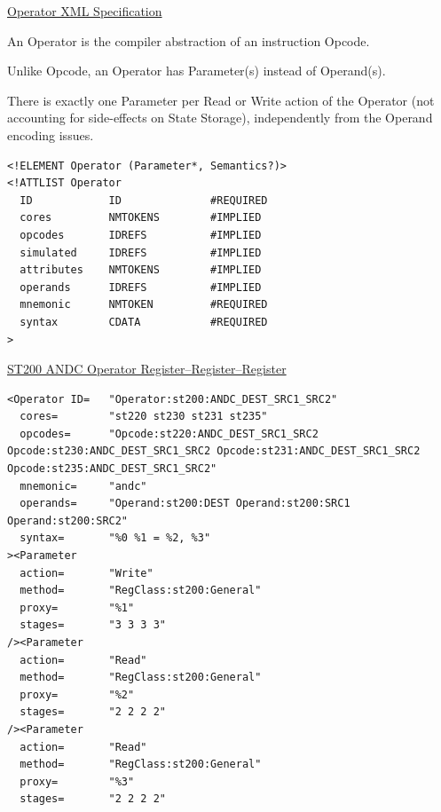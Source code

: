 \documentclass[a4]{seminar}
\begin{document}
\begin{slide}

\begin{center} \underline{Operator XML Specification} \end{center}

An Operator is the compiler abstraction of an instruction Opcode.

Unlike Opcode, an Operator has Parameter(s) instead of Operand(s).

There is exactly one Parameter per Read or Write action of the Operator (not
accounting for side-effects on State Storage), independently from the Operand
encoding issues.

{\scriptsize
\begin{verbatim}
<!ELEMENT Operator (Parameter*, Semantics?)>
<!ATTLIST Operator
  ID            ID              #REQUIRED
  cores         NMTOKENS        #IMPLIED
  opcodes       IDREFS          #IMPLIED
  simulated     IDREFS          #IMPLIED
  attributes    NMTOKENS        #IMPLIED
  operands      IDREFS          #IMPLIED
  mnemonic      NMTOKEN         #REQUIRED
  syntax        CDATA           #REQUIRED
>
\end{verbatim}
}

\end{slide}

\begin{slide}

\begin{center} \underline{ST200 ANDC Operator Register--Register--Register} \end{center}

{\scriptsize
\begin{verbatim}
<Operator ID=   "Operator:st200:ANDC_DEST_SRC1_SRC2"
  cores=        "st220 st230 st231 st235"
  opcodes=      "Opcode:st220:ANDC_DEST_SRC1_SRC2 Opcode:st230:ANDC_DEST_SRC1_SRC2 Opcode:st231:ANDC_DEST_SRC1_SRC2 Opcode:st235:ANDC_DEST_SRC1_SRC2"
  mnemonic=     "andc"
  operands=     "Operand:st200:DEST Operand:st200:SRC1 Operand:st200:SRC2"
  syntax=       "%0 %1 = %2, %3"
><Parameter
  action=       "Write"
  method=       "RegClass:st200:General"
  proxy=        "%1"
  stages=       "3 3 3 3"
/><Parameter
  action=       "Read"
  method=       "RegClass:st200:General"
  proxy=        "%2"
  stages=       "2 2 2 2"
/><Parameter
  action=       "Read"
  method=       "RegClass:st200:General"
  proxy=        "%3"
  stages=       "2 2 2 2"
\end{verbatim}
}

\end{slide}
\end{document}
